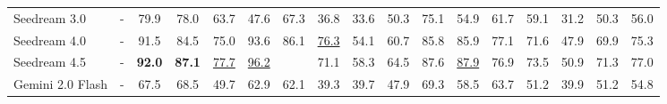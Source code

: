 \begin{table}[t]
{\begin{tabular}{lcccccccccccccccc}
Seedream 3.0                     & -                                  & 79.9                                 & 78.0                                 & 63.7                                 & 47.6                                 & \cellcolor[HTML]{E2E2E2}67.3                                 & 36.8                                 & 33.6                                 & 50.3                                 & 75.1                                 & 54.9                                 & 61.7                                 & 59.1                                 & 31.2                                 & \cellcolor[HTML]{E2E2E2}50.3                                 & 56.0                                 \\
Seedream 4.0                     & -                                  & 91.5                                 & 84.5                                 & 75.0                                 & 93.6                                 & \cellcolor[HTML]{E2E2E2}86.1                                 & {\color[HTML]{319B62} \underline{76.3}}    & 54.1                                 & 60.7                                 & 85.8                                 & 85.9                                 & 77.1                                 & 71.6                                 & 47.9                                 & \cellcolor[HTML]{E2E2E2}69.9                                 & 75.3                                 \\
Seedream 4.5                     & -                                  & {\color[HTML]{319B62} \textbf{92.0}} & {\color[HTML]{319B62} \textbf{87.1}} & {\color[HTML]{319B62} \underline{77.7}}    & {\color[HTML]{319B62} \underline{96.2}}    & \cellcolor[HTML]{E2E2E2}{\color[HTML]{319B62} \underline{88.3}}    & 71.1                                 & 58.3                                 & 64.5                                 & 87.6                                 & {\color[HTML]{319B62} \underline{87.9}}    & 76.9                                 & 73.5                                 & 50.9                                 & \cellcolor[HTML]{E2E2E2}71.3                                 & 77.0                                 \\
Gemini 2.0 Flash                 & -                                  & 67.5                                 & 68.5                                 & 49.7                                 & 62.9                                 & \cellcolor[HTML]{E2E2E2}62.1                                 & 39.3                                 & 39.7                                 & 47.9                                 & 69.3                                 & 58.5                                 & 63.7                                 & 51.2                                 & 39.9                                 & \cellcolor[HTML]{E2E2E2}51.2                                 & 54.8                                 \\

\end{tabular}}
\end{table}
